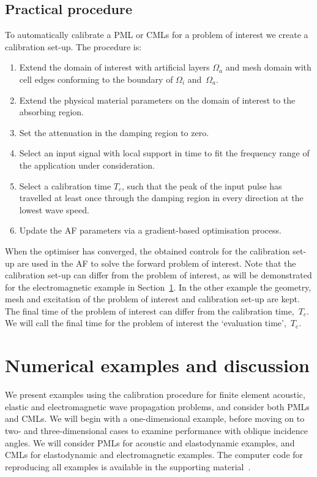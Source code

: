 \documentclass[a4paper]{article}
\begin{document}
\subsection{Practical procedure}
\label{sec:recipe}

To automatically calibrate a PML or CMLs for a problem of interest we
create a calibration set-up. The procedure is:
\begin{enumerate}
\item Extend the domain of interest with artificial layers $\Omega_a$
  and mesh domain with cell edges conforming to the boundary of
  $\Omega_i$ and~$\Omega_a$.

\item Extend the physical material parameters on the domain of
  interest to the absorbing region.

\item Set the attenuation in the damping region to zero.

\item Select an input signal with local support in time to fit the
  frequency range of the application under consideration.

\item Select a calibration time $T_{c}$, such that the peak of the
  input pulse has travelled at least once through the damping region
  in every direction at the lowest wave speed.

\item Update the AF parameters via a gradient-based optimisation
  process.
\end{enumerate}
When the optimiser has converged, the obtained controls for the
calibration set-up are used in the AF to solve the forward problem of
interest.  Note that the calibration set-up can differ from the
problem of interest, as will be demonstrated for the electromagnetic
example in Section~\ref{sec:results}. In the other example the
geometry, mesh and excitation of the problem of interest and
calibration set-up are kept. The final time of the problem of interest
can differ from the calibration time,~$T_{c}$. We will call the final
time for the problem of interest the `evaluation time',~$T_{e}$.

\section{Numerical examples and discussion}
\label{sec:results}

We present examples using the calibration procedure for finite element
acoustic, elastic and electromagnetic wave propagation problems, and
consider both PMLs and CMLs. We will begin with a one-dimensional
example, before moving on to two- and three-dimensional cases to
examine performance with oblique incidence angles.  We will consider
PMLs for acoustic and elastodynamic examples, and CMLs for
elastodynamic and electromagnetic examples. The computer code for
reproducing all examples is available in the supporting
material~\citep{pmlcode}.
\end{document}
